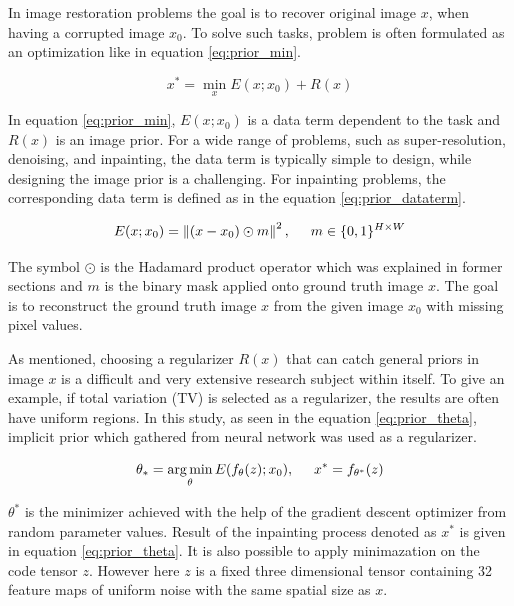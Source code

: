 In image restoration problems the goal is to recover original image \(x\), when having a corrupted image \(x_{0}\). To solve such tasks, problem is often formulated as an optimization like in equation \ref{eq:prior_min}.

\begin{equation}
    x^{\ast} = \min_{x} E(x;x_{0}) + R(x)
    \label{eq:prior_min}
\end{equation}

In equation \ref{eq:prior_min}, \(E(x;x_{0})\) is a data term dependent to the task and \(R(x)\) is an image prior. For a wide range of problems, such as super-resolution, denoising, and inpainting, the data term is typically simple to design, while designing the image prior is a challenging. For inpainting problems, the corresponding data term is defined as in the equation \ref{eq:prior_dataterm}.

\begin{equation}
    E(x;x_{0}) = \left \| (x - x_{0}) \odot m \right \|^{2} , \hspace{5mm} m \in \{0, 1\}^{H \times W}
    \label{eq:prior_dataterm}
\end{equation}

The symbol \(\odot\) is the Hadamard product operator which was explained in former sections and \(m\) is the binary mask applied onto ground truth image \(x\). The goal is to reconstruct the ground truth image \(x\) from the given image \(x_{0}\)  with missing pixel values.

As mentioned, choosing a regularizer \(R(x)\) that can catch general priors in image \(x\) is a difficult and very extensive research subject within itself. To give an example, if total variation (TV) \cite{deep_inverting} is selected as a regularizer, the results are often have uniform regions. In this study, as seen in the equation \ref{eq:prior_theta}, implicit prior which gathered from neural network was used as a regularizer.

\begin{equation}
    \theta_{\ast} = \operatorname*{arg\,min}_{\theta}E(f_{\theta}(z);x_{0}) , \hspace{5mm} x^{\ast} = f_{\theta^{\ast}}(z)
    \label{eq:prior_theta}
\end{equation}

\(\theta^{\ast}\) is the minimizer achieved with the help of the gradient descent optimizer from random parameter values. Result of the inpainting process denoted as \(x^{\ast}\) is given in equation \ref{eq:prior_theta}. It is also possible to apply minimazation on the code tensor \(z\). However here \(z\) is a fixed three dimensional tensor containing 32 feature maps of uniform noise with the same spatial size as \(x\).

